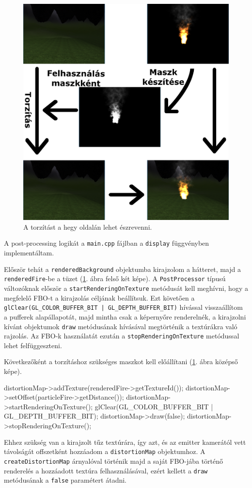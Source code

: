 \begin{figure}[h!]
 \centering
 \includegraphics[width=\textwidth]{kepek/postprocessing.png}
 \caption{A torzítást a hegy oldalán lehet észrevenni.}
 \label{fig:postprocessing}
\end{figure}
A post-processing logikát a \texttt{main.cpp} fájlban a \texttt{display} függvényben implementáltam.

Először tehát a \texttt{renderedBackground} objektumba kirajzolom a hátteret, majd a \texttt{renderedFire}-be a tüzet (\ref{fig:postprocessing}. ábra felső két képe). A \texttt{PostProcessor} típusú változóknak először a \texttt{startRenderingOnTexture} metódusát kell meghívni, hogy a megfelelő FBO-t a kirajzolás céljának beállítsuk. Ezt követően a \texttt{glClear(GL\_COLOR\_BUFFER\_BIT | GL\_DEPTH\_BUFFER\_BIT)} hívással visszaállítom a pufferek alapállapotát, majd mintha csak a képernyőre renderelnék, a kirajzolni kívánt objektumok \texttt{draw} metódusának hívásával megtörténik a textúrákra való rajzolás. Az FBO-k használatát ezután a \texttt{stopRenderingOnTexture} metódussal lehet felfüggeszteni.

Következőként a torzításhoz szükséges maszkot kell előállítani (\ref{fig:postprocessing}. ábra középső képe). 
\begin{cpp}
distortionMap->addTexture(renderedFire->getTextureId());
distortionMap->setOffset(particleFire->getDistance());
distortionMap->startRenderingOnTexture();
glClear(GL_COLOR_BUFFER_BIT | GL_DEPTH_BUFFER_BIT);
distortionMap->draw(false);
distortionMap->stopRenderingOnTexture();
\end{cpp}
Ehhez szükség van a kirajzolt tűz textúrára, így azt, és az emitter kamerától vett távolságát offszetként hozzáadom a \texttt{distortionMap} objektumhoz. A \texttt{createDistortionMap} árnyalóval történik majd a saját FBO-jába történő renderelés a hozzáadott textúra felhasználásával, ezért kellett a \texttt{draw} metódusának a \texttt{false} paramétert átadni. 


